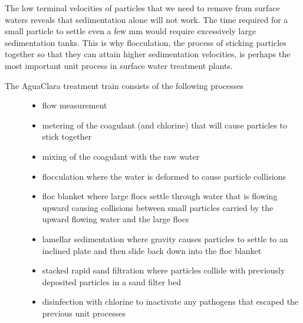 \documentclass[letterpaper,10pt,english]{sphinxmanual}
\begin{document}
The low terminal velocities of particles that we need to remove from surface waters reveals that sedimentation alone will not work. The time required for a small particle to settle even a few mm would require excessively large sedimentation tanks. This is why flocculation, the process of sticking particles together so that they can attain higher sedimentation velocities, is perhaps the most important unit process in surface water treatment plants.
\begin{description}
\item[{The AguaClara treatment train consists of the following processes}] \leavevmode\begin{itemize}
\item {} 
flow measurement

\item {} 
metering of the coagulant (and chlorine) that will cause particles to stick together

\item {} 
mixing of the coagulant with the raw water

\item {} 
flocculation where the water is deformed to cause particle collisions

\item {} 
floc blanket where large flocs settle through water that is flowing upward causing collisions between small particles carried by the upward flowing water and the large flocs

\item {} 
lamellar sedimentation where gravity causes particles to settle to an inclined plate and then slide back down into the floc blanket

\item {} 
stacked rapid sand filtration where particles collide with previously deposited particles in a sand filter bed

\item {} 
disinfection with chlorine to inactivate any pathogens that escaped the previous unit processes

\end{itemize}

\end{description}
\end{document}
